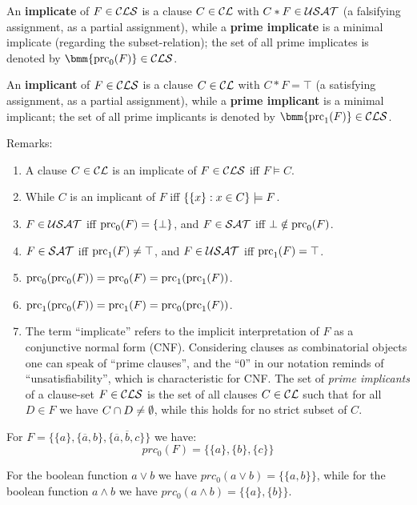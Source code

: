\documentclass[12pt]{book}
\begin{document}
\begin{defi}\label{def:primec}
  An \textbf{implicate} of $F \in \mathcal{CLS}$ is a clause $C \in \mathcal{CL}$ with $C* F \in \mathcal{USAT}$ (a falsifying assignment, as a partial assignment), while a \textbf{prime implicate} is a minimal implicate (regarding the subset-relation); the set of all prime implicates is denoted by $\bmm{\primec_0(F)} \in \Cls$.

  An \textbf{implicant} of $F \in \mathcal{CLS}$ is a clause $C \in \mathcal{CL}$ with $C * F = \top$ (a satisfying assignment, as a partial assignment), while a \textbf{prime implicant} is a minimal implicant; the set of all prime implicants is denoted by $\bmm{\primec_1(F)} \in \Cls$.
\end{defi}
Remarks:
\begin{enumerate}
      \item A clause $C \in \mathcal{CL}$ is an implicate of $F \in \mathcal{CLS}$ iff $F \models C$.
      \item While $C$ is an implicant of $F$ iff $\{ \{ x \} :x \in C \} \models F$.
      \item $F \in \mathcal{USAT}$ iff $\operatorname{prc}_0(F) = \{ \bot \}$, and $F \in \mathcal{SAT}$ iff $\bot \notin \operatorname{prc}_0(F)$.
      \item $F \in \mathcal{SAT}$ iff $\operatorname{prc}_1(F) \ne \top$, and $F \in \mathcal{USAT}$ iff $\operatorname{prc}_1(F) = \top$.
      \item $\operatorname{prc}_0(\operatorname{prc}_0(F)) = \operatorname{prc}_0(F) = \operatorname{prc}_1(\operatorname{prc}_1(F))$.
      \item $\operatorname{prc}_1(\operatorname{prc}_0(F)) = \operatorname{prc}_1(F) = \operatorname{prc}_0(\operatorname{prc}_1(F))$.
      \item  The term ``implicate'' refers to the implicit interpretation of $F$ as a conjunctive normal form (CNF). Considering clauses as combinatorial objects 
	  one can speak of ``prime clauses'', and the ``$0$'' in our notation reminds of ``unsatisfiability'', which is characteristic for CNF.  
	  The set of \emph{prime implicants} of a clause-set $F \in \mathcal{CLS}$ is the set of all clauses $C \in \mathcal{CL}$ such that for all $D \in F$ we have $C \cap D \not= \emptyset$, while this holds 
	  for no strict subset of $C$.
\end{enumerate}

\begin{examp}\label{exp:aaa}
      For $F = \{ \{a\}, \{ \overline a, b \}, \{ \overline a, \overline b, c \} \}$ we have:
      $$ prc_0(F) = \{ \{a\}, \{ b \}, \{ c \} \} $$
\end{examp}

\begin{examp}\label{exp:imp3}
      For the boolean function $ a \vee b$ we have $prc_0(a \vee b) = \{ \{a, b \} \}$, while for the boolean function 
	  $a \wedge b$ we have $prc_0(a \wedge b) = \{ \{ a \}, \{b\}\}$.
\end{examp}
\end{document}
